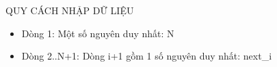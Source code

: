 QUY CÁCH NHẬP DỮ LIỆU
\begin{itemize}
	\item     Dòng 1: Một số nguyên duy nhất: N   
	\item     Dòng 2..N+1: Dòng i+1 gồm 1 số nguyên duy nhất: next\_i   
\end{itemize}